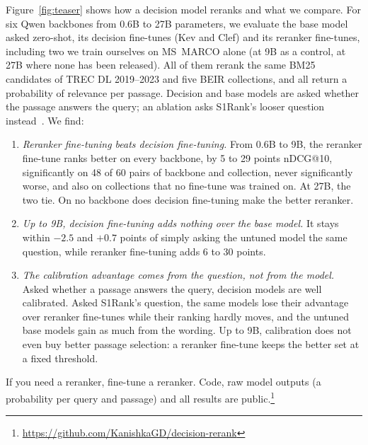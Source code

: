 Figure~\ref{fig:teaser} shows how a decision model reranks and what we compare. For six Qwen backbones from 0.6B to
27B parameters, we evaluate the base model asked zero-shot, its decision fine-tunes (Kev and Clef) and its reranker
fine-tunes, including two we train ourselves on MS~MARCO alone (at 9B as a control, at 27B where none has been
released). All of them rerank the same BM25 candidates of TREC DL 2019--2023 and five BEIR collections, and all
return a probability of relevance per passage. Decision and base models are asked whether the passage answers the
query; an ablation asks S1Rank's looser question instead~\cite{S1Rank}. We find:
\begin{enumerate}
  \item \emph{Reranker fine-tuning beats decision fine-tuning.} From 0.6B to 9B, the reranker fine-tune ranks better
  on every backbone, by 5 to 29 points nDCG@10, significantly on 48 of 60 pairs of backbone and collection, never
  significantly worse, and also on collections that no fine-tune was trained on. At 27B, the two tie. On no backbone
  does decision fine-tuning make the better reranker.
  \item \emph{Up to 9B, decision fine-tuning adds nothing over the base model.} It stays within $-2.5$ and $+0.7$
  points of simply asking the untuned model the same question, while reranker fine-tuning adds 6 to 30 points.
  \item \emph{The calibration advantage comes from the question, not from the model.} Asked whether a passage answers
  the query, decision models are well calibrated. Asked S1Rank's question, the same models lose their advantage over
  reranker fine-tunes while their ranking hardly moves, and the untuned base models gain as much from the wording.
  Up to 9B, calibration does not even buy better passage selection: a reranker fine-tune keeps the better set at a
  fixed threshold.
\end{enumerate}
If you need a reranker, fine-tune a reranker. Code, raw model outputs (a probability per query and passage) and all
results are public.\footnote{\url{https://github.com/KanishkaGD/decision-rerank}}
